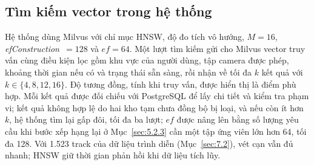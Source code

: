\subsection{Tìm kiếm vector trong hệ thống}
\label{sec:3.6.4}

Hệ thống dùng Milvus với chỉ mục HNSW, độ đo tích vô hướng, $M = 16$, \textit{ef\-Con\-struc\-tion}~$= 128$ và $\mathit{ef} = 64$. Một lượt tìm kiếm gửi cho Milvus vector truy vấn cùng điều kiện lọc gồm khu vực của người dùng, tập camera được phép, khoảng thời gian nếu có và trạng thái sẵn sàng, rồi nhận về tối đa $k$ kết quả với $k \in \{4, 8, 12, 16\}$. Độ tương đồng, tính khi truy vấn, được hiển thị là điểm phù hợp. Mỗi kết quả được đối chiếu với PostgreSQL để lấy chi tiết và kiểm tra phạm vi; kết quả không hợp lệ do hai kho tạm chưa đồng bộ bị loại, và nếu còn ít hơn $k$, hệ thống tìm lại gấp đôi, tối đa ba lượt; $\mathit{ef}$ được nâng lên bằng số lượng yêu cầu khi bước xếp hạng lại ở Mục~\ref{sec:5.2.3} cần một tập ứng viên lớn hơn 64, tối đa 128. Với 1.523 track của dữ liệu trình diễn (Mục~\ref{sec:7.2}), vét cạn vẫn đủ nhanh; HNSW giữ thời gian phản hồi khi dữ liệu tích lũy.

